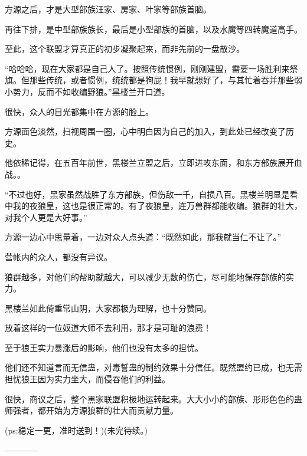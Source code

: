 \begin{this_body}
方源之后，才是大型部族汪家、房家、叶家等部族首脑。

再往下排，是中型部族族长，最后是小型部族的首脑，以及水魔等四转魔道高手。

至此，这个联盟才算真正的初步凝聚起来，而非先前的一盘散沙。

“哈哈哈，现在大家都是自己人了。按照传统惯例，刚刚建盟，需要一场胜利来祭旗。但那些传统，或者惯例，统统都是狗屁！我早就想好了，与其忙着吞并那些弱小势力，反而不如收编野狼。”黑楼兰开口道。

很快，众人的目光都集中在方源的脸上。

方源面色淡然，扫视周围一圈，心中明白因为自己的加入，到此处已经改变了历史。

他依稀记得，在五百年前世，黑楼兰立盟之后，立即进攻东面，和东方部族展开血战。。

“不过也好，黑家虽然战胜了东方部族，但伤敌一千，自损八百。黑楼兰明显是看中我的夜狼皇，这也是很正常的。有了夜狼皇，连万兽群都能收编。狼群的壮大，对我个人更是大好事。”

方源一边心中思量着，一边对众人点头道：“既然如此，那我就当仁不让了。”

营帐内的众人，都没有异议。

狼群越多，对他们的帮助就越大，可以减少无数的伤亡，尽可能地保存部族的实力。

黑楼兰如此倚重常山阴，大家都极为理解，也十分赞同。

放着这样的一位奴道大师不去利用，那才是可耻的浪费！

至于狼王实力暴涨后的影响，他们也没有太多的担忧。

他们还不知道言而无信蛊，对毒誓蛊的制约效果十分信任。既然盟约已成，也无需担忧狼王因为实力坐大，而侵吞他们的利益。

很快，商议之后，整个黑家联盟积极地运转起来。大大小小的部族、形形色色的蛊师强者，都开始为方源狼群的壮大而贡献力量。

(ps:稳定一更，准时送到！)(未完待续。)

------------

\end{this_body}

